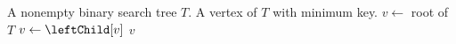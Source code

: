 
\begin{algorithmic}[1]
\Require A nonempty binary search tree $T$.
\Ensure A vertex of $T$ with minimum key.
\State $v \gets$ root of $T$
\While{$\leftChild[v] \neq \MyNull$}
  \State $v \gets \leftChild[v]$
\EndWhile
\State \Return $v$
\end{algorithmic}
